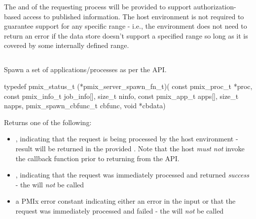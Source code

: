 \advicermstart
The  and  of the requesting process will be provided to support authorization-based access to published information. The host environment is not required to guarantee support for any specific range - i.e., the environment does not need to return an error if the data store doesn't support a specified range so long as it is covered by some internally defined range.
\advicermend


\subsection{}

\summary

Spawn a set of applications/processes as per the  API.

\format

\cspecificstart
\begin{codepar}
typedef pmix_status_t (*pmix_server_spawn_fn_t)(
                             const pmix_proc_t *proc,
                             const pmix_info_t job_info[],
                             size_t ninfo,
                             const pmix_app_t apps[],
                             size_t napps,
                             pmix_spawn_cbfunc_t cbfunc,
                             void *cbdata)
\end{codepar}
\cspecificend

\begin{arglist}
\end{arglist}

Returns one of the following:

\begin{itemize}
    \item {}, indicating that the request is being processed by the host environment - result will be returned in the provided . Note that the host \emph{must not} invoke the callback function prior to returning from the \ac{API}.
    \item {}, indicating that the request was immediately processed and returned \textit{success} - the  will \textit{not} be called
    \item a PMIx error constant indicating either an error in the input or that the request was immediately processed and failed - the  will \textit{not} be called
\end{itemize}

